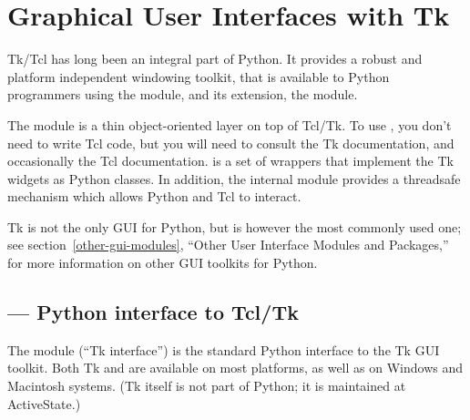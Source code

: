 \chapter{Graphical User Interfaces with Tk \label{tkinter}}


Tk/Tcl has long been an integral part of Python.  It provides a robust
and platform independent windowing toolkit, that is available to
Python programmers using the  module, and its
extension, the  module.

The  module is a thin object-oriented layer on top of
Tcl/Tk. To use , you don't need to write Tcl code,
but you will need to consult the Tk documentation, and occasionally
the Tcl documentation.   is a set of wrappers that
implement the Tk widgets as Python classes.  In addition, the internal
module  provides a threadsafe mechanism which allows
Python and Tcl to interact.

Tk is not the only GUI for Python, but is however the most commonly
used one; see section~\ref{other-gui-modules}, ``Other User Interface
Modules and Packages,'' for more information on other GUI toolkits for
Python.


\localmoduletable


\section{ ---
         Python interface to Tcl/Tk}


The  module (``Tk interface'') is the standard Python
interface to the Tk GUI toolkit.  Both Tk and  are
available on most \UNIX{} platforms, as well as on Windows and
Macintosh systems.  (Tk itself is not part of Python; it is maintained
at ActiveState.)

